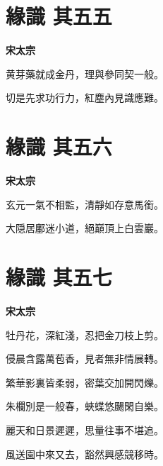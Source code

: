 \documentclass[12pt,a4paper]{ctexbook}
\begin{document}
\section{緣識  其五五}
\textbf{宋太宗}\par\vspace{0.5em}
黄芽藥就成金丹，理與參同契一般。\par
切是先求功行力，紅塵內見識應難。\par

\section{緣識  其五六}
\textbf{宋太宗}\par\vspace{0.5em}
玄元一氣不相監，清靜如存意馬銜。\par
大隠居鄽迷小道，絕巔頂上白雲巖。\par

\section{緣識  其五七}
\textbf{宋太宗}\par\vspace{0.5em}
牡丹花，深紅淺，忍把金刀枝上剪。\par
侵晨含露萬苞香，見者無非情展轉。\par
繁華影裏皆柔弱，密葉交加開閃爍。\par
朱欄別是一般春，蛺蝶悠颺閑自樂。\par
麗天和日景遲遲，思量往事不堪追。\par
風送園中來又去，豁然興感競移時。\par
\end{document}
